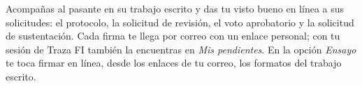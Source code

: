 \documentclass[11pt,a4paper]{article}
\begin{document}
{\small\tableofcontents}
\newpage
\begin{quevasahacer}
Acompañas al pasante en su trabajo escrito y das tu visto bueno en línea a sus solicitudes: el protocolo, la solicitud de revisión, el voto aprobatorio y la solicitud de sustentación. Cada firma te llega por correo con un enlace personal; con tu sesión de Traza FI también la encuentras en \emph{Mis pendientes}. En la opción \emph{Ensayo} te toca firmar en línea, desde los enlaces de tu correo, los formatos del trabajo escrito.
\end{quevasahacer}



\end{document}
